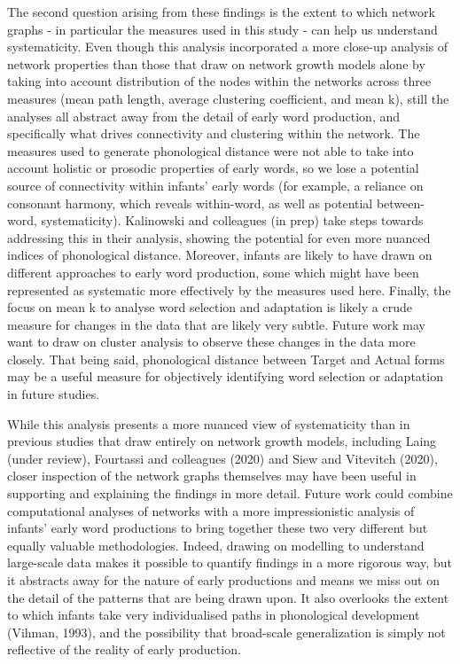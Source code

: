 \documentclass[
  man]{apa6}
\begin{document}
The second question arising from these findings is the extent to which network graphs - in particular the measures used in this study - can help us understand systematicity. Even though this analysis incorporated a more close-up analysis of network properties than those that draw on network growth models alone by taking into account distribution of the nodes within the networks across three measures (mean path length, average clustering coefficient, and mean k), still the analyses all abstract away from the detail of early word production, and specifically what drives connectivity and clustering within the network. The measures used to generate phonological distance were not able to take into account holistic or prosodic properties of early words, so we lose a potential source of connectivity within infants' early words (for example, a reliance on consonant harmony, which reveals within-word, as well as potential between-word, systematicity). Kalinowski and colleagues (in prep) take steps towards addressing this in their analysis, showing the potential for even more nuanced indices of phonological distance. Moreover, infants are likely to have drawn on different approaches to early word production, some which might have been represented as systematic more effectively by the measures used here. Finally, the focus on mean k to analyse word selection and adaptation is likely a crude measure for changes in the data that are likely very subtle. Future work may want to draw on cluster analysis to observe these changes in the data more closely. That being said, phonological distance between Target and Actual forms may be a useful measure for objectively identifying word selection or adaptation in future studies.

While this analysis presents a more nuanced view of systematicity than in previous studies that draw entirely on network growth models, including Laing (under review), Fourtassi and colleagues (2020) and Siew and Vitevitch (2020), closer inspection of the network graphs themselves may have been useful in supporting and explaining the findings in more detail. Future work could combine computational analyses of networks with a more impressionistic analysis of infants' early word productions to bring together these two very different but equally valuable methodologies. Indeed, drawing on modelling to understand large-scale data makes it possible to quantify findings in a more rigorous way, but it abstracts away for the nature of early productions and means we miss out on the detail of the patterns that are being drawn upon. It also overlooks the extent to which infants take very individualised paths in phonological development (Vihman, 1993), and the possibility that broad-scale generalization is simply not reflective of the reality of early production.
\end{document}
